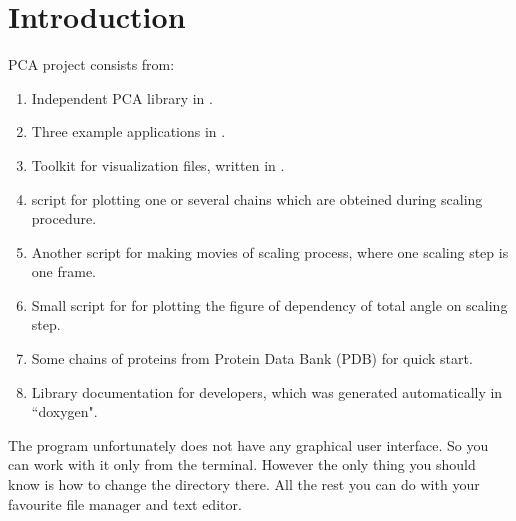 \documentclass[12pt]{article}
\begin{document}
\thispagestyle{empty} %
\titleAT


\newpage
\tableofcontents
\newpage

\section*{Introduction} 
PCA project consists from:
\begin{enumerate}
\item Independent PCA library in .
\item Three example applications in .
\item Toolkit for visualization  files, written in .
\item {} script for plotting one or several chains which are obteined during scaling procedure.
\item Another  script for making movies of scaling process, where one scaling step is one frame.
\item Small script for  for plotting the figure of dependency of total angle on scaling step.
\item Some chains of proteins from Protein Data Bank (PDB) for quick start.
\item Library documentation for developers, which was generated automatically in ``doxygen".
\end{enumerate}
The program unfortunately does not have any graphical user interface. So you can work with it only from the terminal. However the only thing you should know is how to change the directory there. All the rest you can do with your favourite file manager and text editor.
\end{document}
